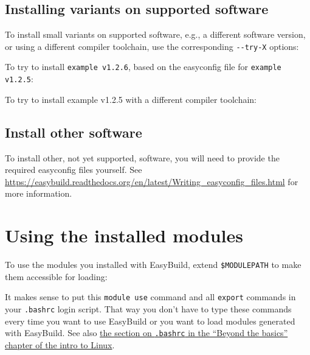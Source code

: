 \subsection{Installing variants on supported software}

To install small variants on supported software, e.g., a different software version,
or using a different compiler toolchain, use the corresponding \lstinline|--try-X| options:

To try to install \lstinline|example v1.2.6|, based on the easyconfig file for \lstinline|example v1.2.5|:

\begin{prompt}
\end{prompt}

To try to install example v1.2.5 with a different compiler toolchain:

\begin{prompt}
\end{prompt}

\subsection{Install other software}

To install other, not yet supported, software, you will need to provide the required
easyconfig files yourself. See \url{https://easybuild.readthedocs.org/en/latest/Writing_easyconfig_files.html}
for more information.

\section{Using the installed modules}

To use the modules you installed with EasyBuild, extend \lstinline|$MODULEPATH|
to make them accessible for loading:

\begin{prompt}
\end{prompt}

It makes sense to put this \lstinline|module use| command and all \lstinline|export|
commands in your \lstinline|.bashrc| login script. That way you don't have to type
these commands every time you want to use EasyBuild or you want to load modules generated
with EasyBuild. See also
\href{\LinuxManualURL#sec:bashrc-login-script}{the section on \texttt{.bashrc} in the ``Beyond the basics'' chapter of the intro to Linux}.
